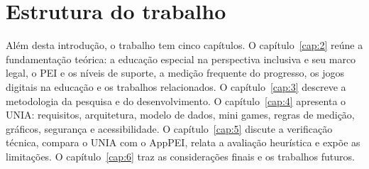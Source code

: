 \section{Estrutura do trabalho}\label{sec:1.3}

Além desta introdução, o trabalho tem cinco capítulos. O capítulo~\ref{cap:2} reúne a fundamentação teórica: a educação especial na perspectiva inclusiva e seu marco legal, o PEI e os níveis de suporte, a medição frequente do progresso, os jogos digitais na educação e os trabalhos relacionados. O capítulo~\ref{cap:3} descreve a metodologia da pesquisa e do desenvolvimento. O capítulo~\ref{cap:4} apresenta o UNIA: requisitos, arquitetura, modelo de dados, mini games, regras de medição, gráficos, segurança e acessibilidade. O capítulo~\ref{cap:5} discute a verificação técnica, compara o UNIA com o AppPEI, relata a avaliação heurística e expõe as limitações. O capítulo~\ref{cap:6} traz as considerações finais e os trabalhos futuros.

